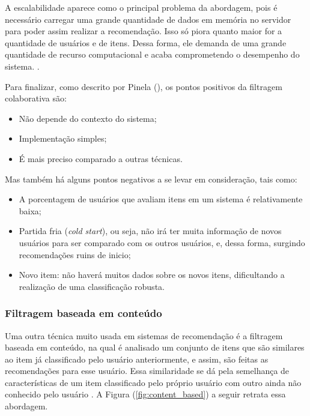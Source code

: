 A escalabilidade aparece como o principal problema da abordagem, pois é necessário carregar uma grande quantidade de dados em memória no servidor para poder assim realizar a recomendação. Isso só piora quanto maior for a quantidade de usuários e de itens. Dessa forma, ele demanda de uma grande quantidade de recurso computacional e acaba comprometendo o desempenho do sistema. \cite{Grover:2017}.

Para finalizar, como descrito por Pinela (\citeyear{Pinela:2017}), os pontos positivos da filtragem colaborativa são:

\begin{itemize}
    \item Não depende do contexto do sistema;
    
    \item Implementação simples;
    
    \item É mais preciso comparado a outras técnicas.
\end{itemize}

Mas também há alguns pontos negativos a se levar em consideração, tais como:

\begin{itemize}
    \item A porcentagem de usuários que avaliam itens em um sistema é relativamente baixa;
    
    \item Partida fria (\textit{cold start}), ou seja, não irá ter muita informação de novos usuários para ser comparado com os outros usuários, e, dessa forma, surgindo recomendações ruins de inicio;
    
    \item Novo item: não haverá muitos dados sobre os novos itens, dificultando a realização de uma classificação robusta.
\end{itemize}

\subsubsection{Filtragem baseada em conteúdo}
\label{Contentbasedfiltering}

Uma outra técnica muito usada em sistemas de recomendação é a filtragem baseada em conteúdo, na qual é analisado um conjunto de itens que são similares ao item já classificado pelo usuário anteriormente, e assim, são feitas as recomendações para esse usuário. Essa similaridade se dá pela semelhança de características de um item classificado pelo próprio usuário com outro ainda não conhecido pelo usuário \cite{Grimaldi:2018}. A Figura (\ref{fig:content_based}) a seguir retrata essa abordagem.

